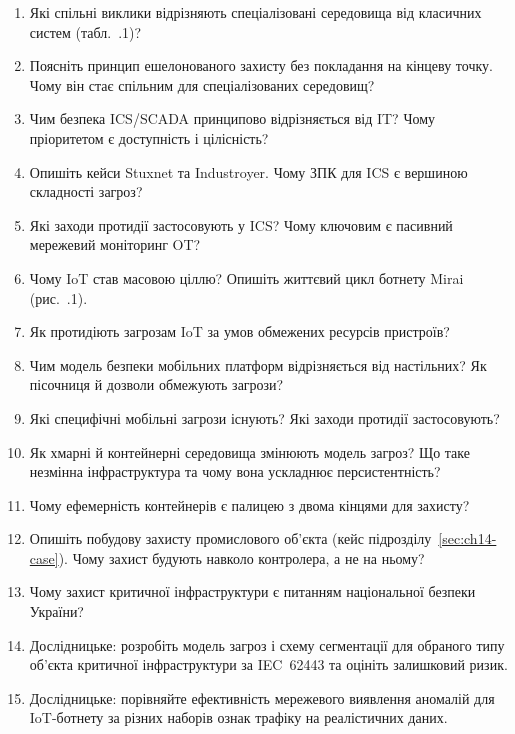 \selfcheck
\begin{enumerate}
\item Які спільні виклики відрізняють спеціалізовані середовища від класичних систем (табл.~\thechapter.1)?
\item Поясніть принцип ешелонованого захисту без покладання на кінцеву точку. Чому він стає спільним для спеціалізованих середовищ?
\item Чим безпека ICS/SCADA принципово відрізняється від IT? Чому пріоритетом є доступність і цілісність?
\item Опишіть кейси Stuxnet та Industroyer. Чому ЗПК для ICS є вершиною складності загроз?
\item Які заходи протидії застосовують у ICS? Чому ключовим є пасивний мережевий моніторинг OT?
\item Чому IoT став масовою ціллю? Опишіть життєвий цикл ботнету Mirai (рис.~\thechapter.1).
\item Як протидіють загрозам IoT за умов обмежених ресурсів пристроїв?
\item Чим модель безпеки мобільних платформ відрізняється від настільних? Як пісочниця й дозволи обмежують загрози?
\item Які специфічні мобільні загрози існують? Які заходи протидії застосовують?
\item Як хмарні й контейнерні середовища змінюють модель загроз? Що таке незмінна інфраструктура та чому вона ускладнює персистентність?
\item Чому ефемерність контейнерів є палицею з двома кінцями для захисту?
\item Опишіть побудову захисту промислового об'єкта (кейс підрозділу~\ref{sec:ch14-case}). Чому захист будують навколо контролера, а не на ньому?
\item Чому захист критичної інфраструктури є питанням національної безпеки України?
\item Дослідницьке: розробіть модель загроз і схему сегментації для обраного типу об'єкта критичної інфраструктури за IEC~62443 та оцініть залишковий ризик.
\item Дослідницьке: порівняйте ефективність мережевого виявлення аномалій для IoT-ботнету за різних наборів ознак трафіку на реалістичних даних.
\end{enumerate}
